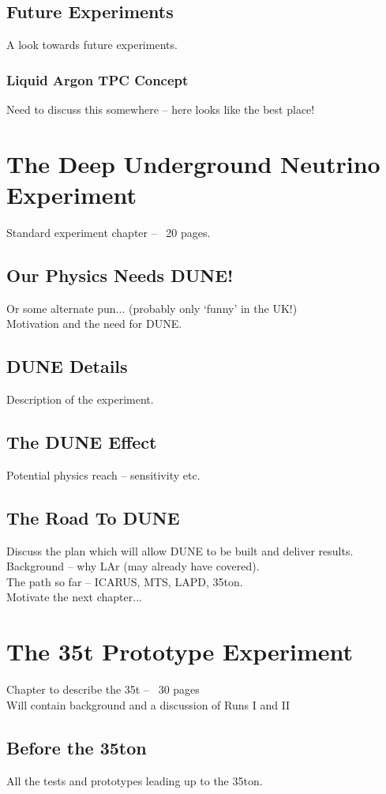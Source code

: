 \documentclass[a4paper,12pt]{report}
\begin{document}
\subsection{Future Experiments}
A look towards future experiments.
\subsubsection{Liquid Argon TPC Concept}
Need to discuss this somewhere -- here looks like the best place!

\section{The Deep Underground Neutrino Experiment}
Standard experiment chapter -- ~20 pages.
\subsection{Our Physics Needs DUNE!}
Or some alternate pun... (probably only `funny' in the UK!)\\
Motivation and the need for DUNE.
\subsection{DUNE Details}
Description of the experiment.
\subsection{The DUNE Effect}
Potential physics reach -- sensitivity etc.
\subsection{The Road To DUNE}
Discuss the plan which will allow DUNE to be built and deliver results.\\
Background -- why LAr (may already have covered).\\
The path so far -- ICARUS, MTS, LAPD, 35ton.\\
Motivate the next chapter...

\section{The 35t Prototype Experiment}
Chapter to describe the 35t -- ~30 pages\\
Will contain background and a discussion of Runs I and II
\subsection{Before the 35ton}
All the tests and prototypes leading up to the 35ton.
\end{document}
